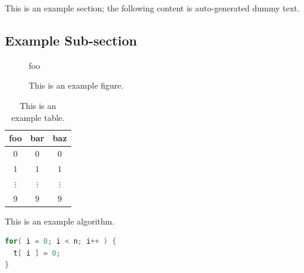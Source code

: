 This is an example section;
the following content is auto-generated dummy text.

\subsection{Example Sub-section}

\begin{figure}[t]
\centering
foo
\caption{This is an example figure.}
\label{fig}
\end{figure}

\begin{table}[t]
\centering
\begin{tabular}{|cc|c|}
\hline
foo      & bar      & baz      \\
\hline
$0     $ & $0     $ & $0     $ \\
$1     $ & $1     $ & $1     $ \\
$\vdots$ & $\vdots$ & $\vdots$ \\
$9     $ & $9     $ & $9     $ \\
\hline
\end{tabular}
\caption{This is an example table.}
\label{tab}
\end{table}

\begin{algorithm}[t]
\caption{This is an example algorithm.}
\label{alg}
\end{algorithm}

\begin{lstlisting}[float={t},caption={This is an example listing.},label={lst},language=C]
for( i = 0; i < n; i++ ) {
  t[ i ] = 0;
}
\end{lstlisting}
